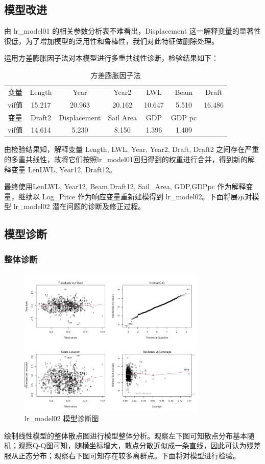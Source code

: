 \documentclass[a4paper,12pt,onecolumn,oneside]{article}
\begin{document}
\subsection{模型改进}
由 lr\_model01 的相关参数分析表不难看出，Displacement 这一解释变量的显著性很低，为了增加模型的泛用性和鲁棒性，我们对此特征做删除处理。\par 
运用方差膨胀因子法对本模型进行多重共线性诊断，检验结果如下：\par 
\begin{table}[h]
	\centering
	\caption{方差膨胀因子法}\vspace{0.25\baselineskip}
	\begin{tabular}{ccccccc}
		\toprule
		变量 & Length & Year & Year2 & LWL & Beam & Draft \\
		vif值 & 15.217 & 20.963 & 20.162 & 10.647 & 5.510 & 16.486 \\
		\hline
		变量 & Draft2 & Displacement & Sail Area & GDP & GDP pc &\\
		vif值 & 14.614 & 5.230 & 8.150 & 1.396 & 1.409 &\\
		\bottomrule
	\end{tabular}
\end{table}
由检验结果知，解释变量 Length, LWL, Year, Year2, Draft, Draft2 之间存在严重的多重共线性，故将它们按照lr\_model01回归得到的权重进行合并，得到新的解释变量 LenLWL, Year12, Draft12。\par
最终使用LenLWL, Year12, Beam,Draft12, Sail\_Area, GDP,GDPpc 作为解释变量，继续以 Log\_Price 作为响应变量重新建模得到 lr\_model02。下面将展示对模型 lr\_model02 潜在问题的诊断及修正过程。
\subsection{模型诊断}
\subsubsection{整体诊断}
	\begin{figure}[H]
	\centering
	\includegraphics[width=0.8\textwidth]{res/zhenduan2.png}
	\caption{lr\_model02 模型诊断图}
	\label{fig:zhenduan2}
\end{figure}
绘制线性模型的整体散点图进行模型整体分析。观察左下图可知散点分布基本随机；观察Q-Q图可知，随横坐标增大，散点分散近似成一条直线，因此可认为残差服从正态分布；观察右下图可知存在较多离群点。下面将对模型进行检验。
\end{document}
